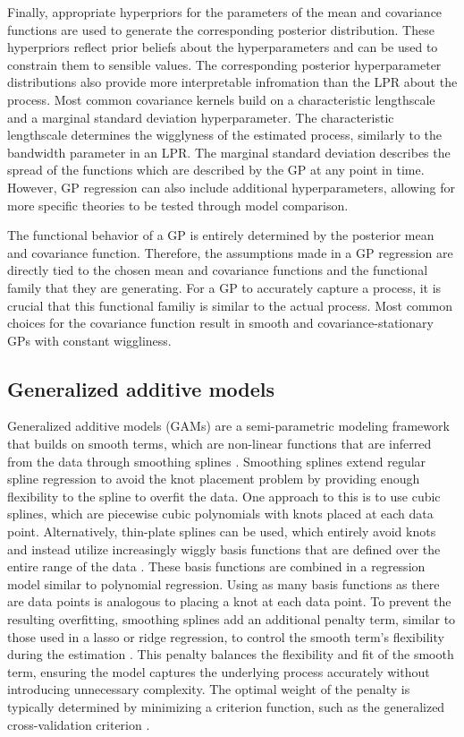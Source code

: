 \documentclass[man, floatsintext]{apa7}
\begin{document}
Finally, appropriate
hyperpriors for the parameters of the mean and covariance functions are used
to generate the corresponding posterior distribution. These hyperpriors reflect
prior beliefs about the hyperparameters and can be used to constrain them to
sensible values. The corresponding posterior hyperparameter distributions
also provide more interpretable infromation than the LPR about the process.
Most common covariance kernels build on a
characteristic lengthscale and a marginal standard deviation hyperparameter.
The characteristic lengthscale determines the wigglyness of the estimated
process, similarly to the bandwidth parameter in an LPR\@. The marginal
standard deviation describes the spread of the functions which are described
by the GP at any point in time. However, GP regression can also
include additional hyperparameters, allowing for more specific theories to be
tested through model comparison.

The functional behavior of a GP is entirely determined by the posterior mean
and covariance function. Therefore, the assumptions made in a GP regression
are directly tied to the chosen mean and covariance functions and the
functional family that they are generating. For a GP to accurately capture a
process, it is crucial that this functional familiy is similar to the actual
process. Most common choices for the covariance function result in smooth and
covariance-stationary GPs with constant wiggliness.

\subsection{Generalized additive models}

Generalized additive models (GAMs) are a semi-parametric modeling framework
that builds on smooth terms, which are
non-linear functions that are inferred from the data through smoothing splines
\parencite{wood_generalized_2006, wood_inference_2020,
  hastie_generalized_1999}. Smoothing splines extend regular spline regression
to avoid the knot placement problem by providing enough flexibility to the
spline to overfit the data. One approach to this is to use
cubic splines, which are piecewise cubic polynomials with knots placed at
each data point. Alternatively, thin-plate splines can be used, which entirely
avoid knots and instead utilize increasingly wiggly basis functions
that are defined over the entire range of the data \parencite{wood_thin_2003}.
These basis functions are combined in a regression model similar to polynomial
regression. Using as many basis functions as there are data points is analogous
to placing a knot at each data point.
To prevent the resulting overfitting, smoothing splines
add an additional penalty term, similar to those used in a
lasso or ridge regression, to control the smooth term's flexibility during
the estimation \parencite{gu_smoothing_2013, wahba_spline_1980}. This penalty
balances the
flexibility and fit of the smooth term, ensuring the model captures the
underlying process accurately without introducing unnecessary complexity. The
optimal weight of the penalty is typically determined by minimizing a criterion
function, such as the generalized cross-validation criterion
\parencite{wood_generalized_2006, golub_generalized_1997}.
\end{document}
